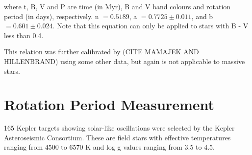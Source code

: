 \documentclass[12pt,preprint]{aastex}
\begin{document}
where t, B, V and P are time (in Myr), B and V band colours and rotation period 
(in days), respectively. n $= 0.5189$, a $ = 0.7725 \pm 0.011$, and b $ = 0.601 \pm 0.024$. 
Note that this equation can only be applied to stars with B - V less than 0.4. 

This relation was further calibrated by (CITE MAMAJEK AND HILLENBRAND) using some other data, but again is not applicable to massive stars. 



\section{Rotation Period Measurement}
\label{rotation_period_measurement}


165 Kepler targets showing solar-like oscillations were selected by
the Kepler Asteroseismic Consortium. These are field stars with effective
temperatures ranging from 4500 to 6570 K and log g values ranging from 3.5 to 4.5. 
\end{document}
